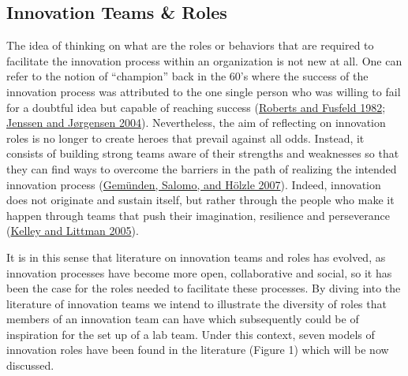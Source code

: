 \documentclass[AMA,STIX1COL,APA,STIX2COL]{WileyNJD-v2}
\begin{document}
\hypertarget{innovation-teams-roles}{%
\subsection{Innovation Teams \& Roles}\label{innovation-teams-roles}}

The idea of thinking on what are the roles or behaviors that are
required to facilitate the innovation process within an organization is
not new at all. One can refer to the notion of ``champion'' back in the
60's where the success of the innovation process was attributed to the
one single person who was willing to fail for a doubtful idea but
capable of reaching success (\protect\hyperlink{ref-Roberts1982}{Roberts
and Fusfeld 1982}; \protect\hyperlink{ref-Jenssen2004}{Jenssen and
Jørgensen 2004}). Nevertheless, the aim of reflecting on innovation
roles is no longer to create heroes that prevail against all odds.
Instead, it consists of building strong teams aware of their strengths
and weaknesses so that they can find ways to overcome the barriers in
the path of realizing the intended innovation process
(\protect\hyperlink{ref-Gemunden2007}{Gemünden, Salomo, and Hölzle
2007}). Indeed, innovation does not originate and sustain itself, but
rather through the people who make it happen through teams that push
their imagination, resilience and perseverance
(\protect\hyperlink{ref-Kelley2005}{Kelley and Littman 2005}).

It is in this sense that literature on innovation teams and roles has
evolved, as innovation processes have become more open, collaborative
and social, so it has been the case for the roles needed to facilitate
these processes. By diving into the literature of innovation teams we
intend to illustrate the diversity of roles that members of an
innovation team can have which subsequently could be of inspiration for
the set up of a lab team. Under this context, seven models of innovation
roles have been found in the literature (Figure 1) which will be now
discussed.
\end{document}
